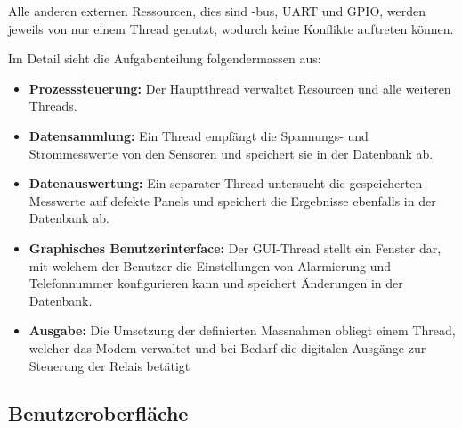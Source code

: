 Alle anderen  externen Ressourcen, dies  sind \ISC-bus, UART und  GPIO, werden
jeweils  von  nur einem  Thread  genutzt,  wodurch keine  Konflikte  auftreten
k\"onnen.

Im Detail sieht die Aufgabenteilung folgendermassen aus:

\begin{itemize}
    \tightlist
    \item
        \textbf{Prozesssteuerung:} Der  Hauptthread  verwaltet  Resourcen  und
        alle weiteren Threads.
    \item
        \textbf{Datensammlung:} Ein  Thread  empf\"angt   die  Spannungs-  und
        Strommesswerte von den Sensoren und speichert sie in der Datenbank ab.
    \item
        \textbf{Datenauswertung:} Ein   separater    Thread   untersucht   die
        gespeicherten  Messwerte   auf  defekte   Panels  und   speichert  die
        Ergebnisse ebenfalls in der Datenbank ab.
    \item
        \textbf{Graphisches  Benutzerinterface:} Der   GUI-Thread  stellt  ein
        Fenster  dar,   mit  welchem   der  Benutzer  die   Einstellungen  von
        Alarmierung  und   Telefonnummer  konfigurieren  kann   und  speichert
        \"Anderungen in der Datenbank.
    \item
        \textbf{Ausgabe:} Die  Umsetzung  der definierten  Massnahmen  obliegt
        einem Thread, welcher das Modem verwaltet und bei Bedarf die digitalen
        Ausg\"ange zur Steuerung der Relais bet\"atigt
\end{itemize}


\subsection{Benutzeroberfl\"ache}
\label{subsec:software:master:GUI}

